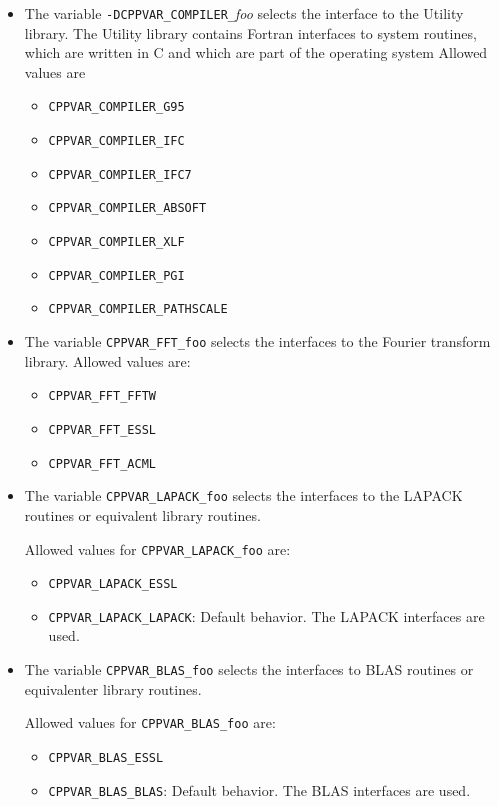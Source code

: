 \documentclass[a4paper,10pt]{report}
\newcommand{\mytt}[1]{{\tt #1}}
\begin{document}
\begin{itemize}
\item The variable \mytt{-DCPPVAR\_COMPILER\_}\textit{foo} selects the
interface to the Utility library. The Utility library contains Fortran
interfaces to system routines, which are written in C and which are
part of the operating system Allowed values are
\begin{itemize}
\item \verb+CPPVAR_COMPILER_G95+
\item \verb+CPPVAR_COMPILER_IFC+
\item \verb+CPPVAR_COMPILER_IFC7+
\item \verb+CPPVAR_COMPILER_ABSOFT+
\item \verb+CPPVAR_COMPILER_XLF+
\item \verb+CPPVAR_COMPILER_PGI+
\item \verb+CPPVAR_COMPILER_PATHSCALE+
\end{itemize}
\item The variable \verb+CPPVAR_FFT_foo+ selects the interfaces to the
Fourier transform library. Allowed values are:
\begin{itemize}
\item \verb+CPPVAR_FFT_FFTW+
\item \verb+CPPVAR_FFT_ESSL+
\item \verb+CPPVAR_FFT_ACML+
\end{itemize}
\item The variable \verb+CPPVAR_LAPACK_foo+ selects the interfaces to
the LAPACK routines or equivalent library routines.

Allowed values for \verb+CPPVAR_LAPACK_foo+ are:
\begin{itemize}
\item \verb+CPPVAR_LAPACK_ESSL+
\item \verb+CPPVAR_LAPACK_LAPACK+: Default behavior. The LAPACK interfaces are used.
\end{itemize}
\item The variable \verb+CPPVAR_BLAS_foo+ selects the interfaces to
BLAS routines or equivalenter library routines. 

Allowed values for \verb+CPPVAR_BLAS_foo+ are:
\begin{itemize}
\item \verb+CPPVAR_BLAS_ESSL+
\item \verb+CPPVAR_BLAS_BLAS+: Default behavior. The BLAS interfaces are used.
\end{itemize}
\end{itemize}
\end{document}
